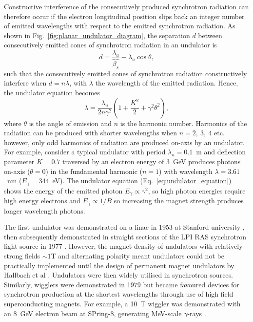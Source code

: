 \documentclass[../main.tex]{subfiles}
\begin{document}
Constructive interference of the consecutively produced synchrotron radiation can therefore occur if the electron longitudinal position slips back an integer number of emitted wavelengths with respect to the emitted synchrotron radiation. As shown in Fig.~\ref{fig:planar_undulator_diagram}, the separation $d$ between consecutively emitted cones of synchrotron radiation in an undulator is 
\begin{equation}
d = \frac{\lambda_{u}}{\hat{\beta_{s}}} - \lambda_{u}\cos\theta,
\label{eq:undulator_constructive_interference}    
\end{equation}
such that the consecutively emitted cones of synchrotron radiation constructively interfere when $d=n\lambda$, with $\lambda$ the wavelength of the emitted radiation. Hence, the undulator equation becomes
\begin{equation}
\lambda = \frac{\lambda_{u}}{2n\gamma^{2}}\left(1+\frac{K^{2}}{2}+\gamma^{2}\theta^{2}\right),
\label{eq:undulator_equation}    
\end{equation}
where $\theta$ is the angle of emission and $n$ is the harmonic number. Harmonics of the radiation can be produced with shorter wavelengths when $n = 2,~3,~4$ etc. however, only odd harmonics of radiation are produced on-axis by an undulator. For example, consider a typical undulator with period $\lambda_{u} = 0.1$~\si{\meter} and deflection parameter $K = 0.7$ traversed by an electron energy of 3~\si{\giga\electronvolt} produces photons on-axis ($\theta = 0$) in the fundamental harmonic ($n=1$) with wavelength $\lambda = 3.61$~\si{\nano\meter} ($E_{\gamma} = 344$~\si{\electronvolt}). The undulator equation (Eq.~\ref{eq:undulator_equation}) shows the energy of the emitted photon $E_{\gamma} \propto \gamma^{2}$, so high photon energies require high energy electrons and $E_{\gamma} \propto 1/B$ so increasing the magnet strength produces longer wavelength photons. 

The first undulator was demonstrated on a linac in 1953 at Stanford university \cite{motz1953experiments}, then subsequently demonstrated in straight sections of the LPI RAS synchrotron light source in 1977 \cite{bessonov2010light}. However, the magnet density of undulators with relatively strong fields $\sim1$\si{\tesla} and alternating polarity meant undulators could not be practically implemented until the design of permanent magnet undulators by Hallbach et al \cite{halbach1983permanent}. Undulators were then widely utilised in synchrotron sources. Similarly, wigglers were demonstrated in 1979 \cite{berndt1979initial} but became favoured devices for synchrotron production at the shortest wavelengths through use of high field superconducting magnets. For example, a 10~\si{\tesla} wiggler was demonstrated with an 8~\si{\giga\electronvolt} electron beam at SPring-8, generating \si{\mega\electronvolt}-scale $\gamma$-rays \cite{soutome2003generation}.    
\end{document}
